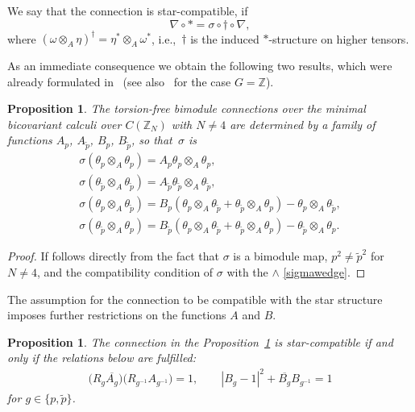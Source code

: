 \documentclass[pdftex]{sigma}
\numberwithin{equation}{section}
\newtheorem{Proposition}[Theorem]{Proposition}
 { \theoremstyle{definition}
\newtheorem{Definition}[Theorem]{Definition}
\newtheorem{Example}[Theorem]{Example}
\newtheorem{Remark}[Theorem]{Remark} }
\newcommand{\Z}{\mathbb{Z}}
\newcommand{\ip}{{\tilde{p}}}
\begin{document}
\begin{Definition}
We say that the connection is star-compatible, if
\[ \nabla\circ \ast=\sigma\circ \dagger \circ \nabla,\]
where $(\omega\otimes_A \eta)^\dagger=\eta^\ast\otimes_A\omega^\ast$, i.e.,~$\dagger$ is the induced $\ast$-structure on higher tensors.
\end{Definition}

As an immediate consequence we obtain the following two results, which were already formulated in~\cite{majid2020}
(see also~\cite{M2} for the case $G=\mathbb{Z}$).

\begin{Proposition}\label{sigmy}The torsion-free bimodule connections over the minimal bicovariant calculi over $C(\Z_N)$ with $N\neq 4$ are determined by a family of functions $A_p$, $A_\ip$, $B_p$, $B_\ip$, so that~$\sigma$ is
\begin{gather*}
 \sigma(\theta_p \otimes_A \theta_p) = A_p \theta_p \otimes_A \theta_p,\\
\sigma(\theta_\ip \otimes_A \theta_\ip) = A_\ip \theta_\ip \otimes_A \theta_\ip, \\
\sigma(\theta_p \otimes_A \theta_\ip) = B_p ( \theta_p \otimes_A \theta_\ip + \theta_\ip \otimes_A \theta_p ) - \theta_p \otimes_A \theta_\ip, \\
\sigma(\theta_\ip \otimes_A \theta_p) = B_\ip ( \theta_p \otimes_A \theta_\ip + \theta_\ip \otimes_A \theta_p ) - \theta_\ip \otimes_A \theta_p.
\end{gather*}
\end{Proposition}
\begin{proof}
If follows directly from the fact that $\sigma$ is a bimodule map, $p^2\neq \ip^2$ for $N\neq 4$, and the compatibility condition
of $\sigma$ with the $\wedge$ \eqref{sigmawedge}.
\end{proof}
The assumption for the connection to be compatible with the star structure imposes further restrictions on the functions $A$ and $B$.
\begin{Proposition}
The connection in the Proposition~{\rm \ref{sigmy}} is star-compatible if and only if the relations below are fulfilled:
\begin{gather}
\big(R_{g}\overline{A_g}\big)\big(R_{g^{-1}}A_{g^{-1}}\big)=1,\qquad
|B_g-1|^2 + \overline{B_g}B_{g^{-1}}=1\label{star-connection}
\end{gather}
for $g\in\{p,\ip\}$.
\end{Proposition}
\end{document}
